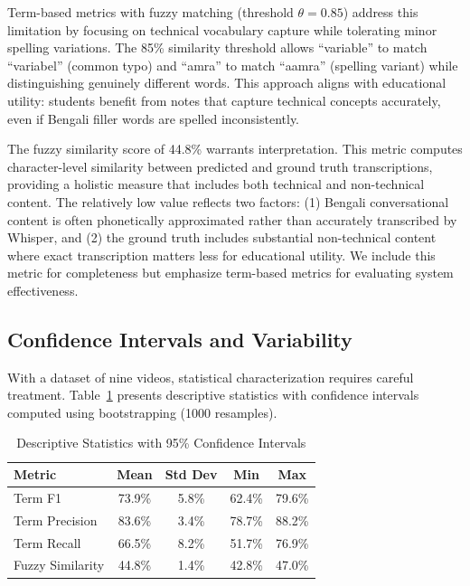 Term-based metrics with fuzzy matching (threshold $\theta = 0.85$) address this limitation by focusing on technical vocabulary capture while tolerating minor spelling variations. The 85\% similarity threshold allows ``variable'' to match ``variabel'' (common typo) and ``amra'' to match ``aamra'' (spelling variant) while distinguishing genuinely different words. This approach aligns with educational utility: students benefit from notes that capture technical concepts accurately, even if Bengali filler words are spelled inconsistently.

The fuzzy similarity score of 44.8\% warrants interpretation. This metric computes character-level similarity between predicted and ground truth transcriptions, providing a holistic measure that includes both technical and non-technical content. The relatively low value reflects two factors: (1) Bengali conversational content is often phonetically approximated rather than accurately transcribed by Whisper, and (2) the ground truth includes substantial non-technical content where exact transcription matters less for educational utility. We include this metric for completeness but emphasize term-based metrics for evaluating system effectiveness.

\subsection{Confidence Intervals and Variability}

With a dataset of nine videos, statistical characterization requires careful treatment. Table~\ref{tab:confidence_intervals} presents descriptive statistics with confidence intervals computed using bootstrapping (1000 resamples).

\begin{table}[h]
\centering
\caption{Descriptive Statistics with 95\% Confidence Intervals}
\label{tab:confidence_intervals}
\begin{tabular}{|l|c|c|c|c|}
\hline
\textbf{Metric} & \textbf{Mean} & \textbf{Std Dev} & \textbf{Min} & \textbf{Max} \\
\hline
Term F1 & 73.9\% & 5.8\% & 62.4\% & 79.6\% \\
\hline
Term Precision & 83.6\% & 3.4\% & 78.7\% & 88.2\% \\
\hline
Term Recall & 66.5\% & 8.2\% & 51.7\% & 76.9\% \\
\hline
Fuzzy Similarity & 44.8\% & 1.4\% & 42.8\% & 47.0\% \\
\hline
\end{tabular}
\end{table}

